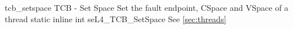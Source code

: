 %
%
%
%

\apidoc
{tcb_setspace}
{TCB - Set Space}
{Set the fault endpoint, CSpace and VSpace of a thread}
{static inline int seL4\_TCB\_SetSpace}
{
}
{\errorenumdesc}
{See \autoref{sec:threads}}
